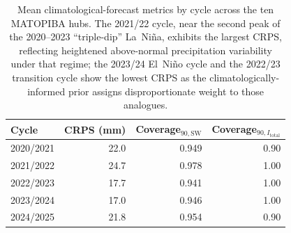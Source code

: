 \begin{table}[!t]
\centering
\caption{Mean climatological-forecast metrics by cycle across the ten MATOPIBA hubs. The 2021/22 cycle, near the second peak of the 2020--2023 ``triple-dip'' La~Ni\~na, exhibits the largest CRPS, reflecting heightened above-normal precipitation variability under that regime; the 2023/24 El~Ni\~no cycle and the 2022/23 transition cycle show the lowest CRPS as the climatologically-informed prior assigns disproportionate weight to those analogues.}
\label{tab:forecast_by_cycle}
\begin{tabular}{lrrr}
\toprule
Cycle & CRPS (mm) & Coverage$_{90,\mathrm{SW}}$ & Coverage$_{90,I_{\mathrm{total}}}$ \\
\midrule
2020/2021 & 22.0 & 0.949 & 0.90 \\
2021/2022 & 24.7 & 0.978 & 1.00 \\
2022/2023 & 17.7 & 0.941 & 1.00 \\
2023/2024 & 17.0 & 0.946 & 1.00 \\
2024/2025 & 21.8 & 0.954 & 0.90 \\
\bottomrule
\end{tabular}
\end{table}
